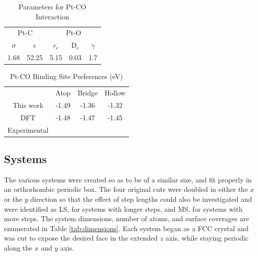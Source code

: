 \begin{table}[ht]
\caption{Parameters for Pt-CO Interaction}
\centering
\begin{tabular}{c c c c c}
\hline\hline
\multicolumn{2}{c}{Pt-C} & \multicolumn{3}{c}{Pt-O}  \\
$\sigma$ & $\epsilon$ & $r_{e}$ & $\mathrm{D}_e$ & $\gamma$ \\
1.68 & 52.25 & 5.15 & 0.03 & 1.7 \\
\hline
\end{tabular}
\label{table:pt-co}
\end{table}

\begin{table}[ht]
\caption{Pt-CO Binding Site Preferences (eV)}
\centering
\begin{tabular}{c c c c}
\hline\hline
& Atop & Bridge & Hollow \\
This work & -1.49 & -1.36 & -1.32 \\
DFT \citep{Deshlahra:2012aa} & -1.48 & -1.47 & -1.45 \\
Experimental\citep{} & & & \\
\hline
\end{tabular}
\label{table:sites}
\end{table}


\subsection{Systems}

The various  systems were created so as to be of a similar size, and fit
properly in an orthorhombic periodic box. The four original cuts were
doubled in either the $x$ or the $y$ direction so that the effect of step
lengths could also be investigated and were identified as LS, for systems with longer steps, and MS, for systems with more steps. The system dimensions, number of atoms, and
surface coverages are enumerated in Table \ref{tab:dimensions}. Each system began
as a FCC crystal and was cut to expose the desired face in the extended $z$ axis,
while staying periodic along the $x$ and $y$ axis.


